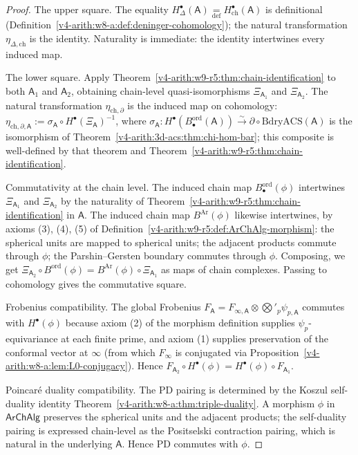 \begin{proof}
The upper square. The equality
\(H^{\bullet}_{\Delta}(\mathsf{A})\underset{\mathrm{def}}{=}H^{\bullet}_{\mathrm{ch}}(\mathsf{A})\)
is definitional (Definition~\ref{v4-arith:w8-a:def:deninger-cohomology}); the
natural transformation \(\eta_{\Delta,\mathrm{ch}}\) is the identity.
Naturality is immediate: the identity intertwines every induced map.

The lower square. Apply Theorem~\ref{v4-arith:w9-r5:thm:chain-identification}
to both \(\mathsf{A}_{1}\) and \(\mathsf{A}_{2}\), obtaining chain-level
quasi-isomorphisms \(\Xi_{\mathsf{A}_{1}}\) and \(\Xi_{\mathsf{A}_{2}}\).
The natural transformation \(\eta_{\mathrm{ch},\partial}\) is the
induced map on cohomology:
\(\eta_{\mathrm{ch},\partial,\mathsf{A}}:=\sigma_{\mathsf{A}}\circ H^{\bullet}(\Xi_{\mathsf{A}})^{-1}\),
where \(\sigma_{\mathsf{A}}\colon H^{\bullet}(B^{\mathrm{ord}}_{\bullet}(\mathsf{A}))\xrightarrow{\sim}\partial\circ\mathrm{BdryACS}(\mathsf{A})\)
is the isomorphism of Theorem~\ref{v4-arith:3d-acs:thm:chi-hom-bar}; this
composite is well-defined by that theorem and
Theorem~\ref{v4-arith:w9-r5:thm:chain-identification}.

Commutativity at the chain level. The induced chain map
\(B^{\mathrm{ord}}_{\bullet}(\phi)\) intertwines \(\Xi_{\mathsf{A}_{1}}\)
and \(\Xi_{\mathsf{A}_{2}}\) by the naturality of
Theorem~\ref{v4-arith:w9-r5:thm:chain-identification} in \(\mathsf{A}\). The
induced chain map \(B^{\mathrm{Ar}}(\phi)\) likewise intertwines, by
axioms (3), (4), (5) of Definition~\ref{v4-arith:w9-r5:def:ArChAlg-morphism}:
the spherical units are mapped to spherical units; the adjacent
products commute through \(\phi\); the Parshin--Gersten boundary
commutes through \(\phi\). Composing, we get
\(\Xi_{\mathsf{A}_{2}}\circ B^{\mathrm{ord}}(\phi)=B^{\mathrm{Ar}}(\phi)\circ\Xi_{\mathsf{A}_{1}}\)
as maps of chain complexes. Passing to cohomology gives the
commutative square.

Frobenius compatibility. The global Frobenius
\(F_{\mathsf{A}}=F_{\infty,\mathsf{A}}\otimes\bigotimes'_{p}\psi_{p,\mathsf{A}}\)
commutes with \(H^{\bullet}(\phi)\) because axiom (2) of the morphism
definition supplies \(\psi_{p}\)-equivariance at each finite prime,
and axiom (1) supplies preservation of the conformal vector at
\(\infty\) (from which \(F_{\infty}\) is conjugated via
Proposition~\ref{v4-arith:w8-a:lem:L0-conjugacy}). Hence
\(F_{\mathsf{A}_{2}}\circ H^{\bullet}(\phi)=H^{\bullet}(\phi)\circ F_{\mathsf{A}_{1}}\).

Poincar\'e duality compatibility. The PD pairing is determined by
the Koszul self-duality identity
Theorem~\ref{v4-arith:w8-a:thm:triple-duality}. A morphism \(\phi\) in
\(\mathsf{ArChAlg}\) preserves the spherical units and the adjacent
products; the self-duality pairing is expressed chain-level as the
Positselski contraction pairing, which is natural in the underlying
\(\mathsf{A}\). Hence \(\mathrm{PD}\) commutes with \(\phi\).
\end{proof}

